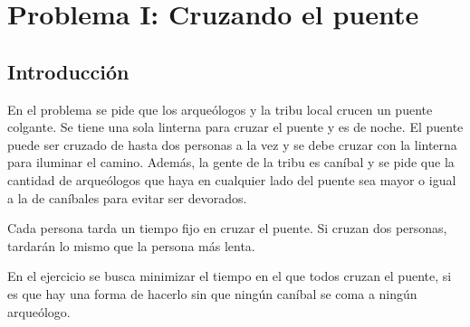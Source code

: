 \section{Problema I: Cruzando el puente}

\subsection{Introducción}

En el problema se pide que los arqueólogos y la tribu local crucen un puente colgante. Se tiene una sola linterna para cruzar el puente y es de noche. El puente puede ser cruzado de hasta dos personas a la vez y se debe cruzar con la linterna para iluminar el camino.
Además, la gente de la tribu es caníbal y se pide que la cantidad de arqueólogos que haya en cualquier lado del puente sea mayor o igual a la de caníbales para evitar ser devorados. 

Cada persona tarda un tiempo fijo en cruzar el puente. Si cruzan dos personas, tardarán lo mismo que la persona más lenta.

En el ejercicio se busca minimizar el tiempo en el que todos cruzan el puente, si es que hay una forma de hacerlo sin que ningún caníbal se coma a ningún arqueólogo. 


